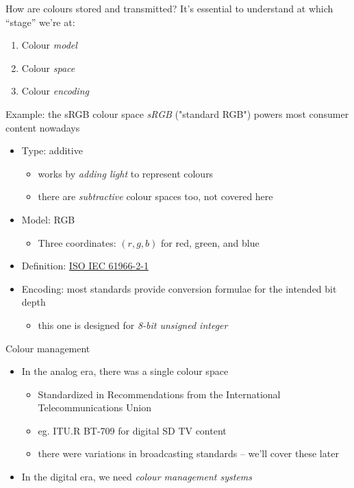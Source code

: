 \documentclass[aspectratio=169,handout]{fireshonks}
\begin{document}
\begin{frame}{How are colours stored and transmitted?}
    It's essential to understand at which \enquote{stage} we're at:
    \begin{enumerate}
        \item Colour \emph{model}
        \item Colour \emph{space}
        \item Colour \emph{encoding}
    \end{enumerate}
\end{frame}
\begin{frame}{Example: the sRGB colour space}
    \emph{sRGB} ("standard RGB") powers most consumer content nowadays
    \begin{itemize}
        \item Type: additive
              \begin{itemize}
                  \item works by \emph{adding light} to represent colours
                  \item there are \emph{subtractive} colour spaces too, not covered here
              \end{itemize}
        \item Model: RGB
              \begin{itemize}
                  \item Three coordinates: $(r, g, b)$ for red, green, and blue
              \end{itemize}
        \item Definition: \href{https://www.evs.ee/en/evs-en-61966-2-1-2002}{ISO IEC 61966-2-1}
        \item Encoding: most standards provide conversion formulae for the intended bit depth
              \begin{itemize}
                  \item this one is designed for \emph{8-bit unsigned integer}
              \end{itemize}
    \end{itemize}
\end{frame}
\begin{frame}{Colour management}
    \begin{itemize}
        \item In the analog era, there was a single colour space
              \begin{itemize}
                  \item Standardized in Recommendations from the International Telecommunications Union
                  \item eg. ITU.R BT-709 \parencite{BT709} for digital SD TV content
                  \item there were variations in broadcasting standards -- we'll cover these later
              \end{itemize}
        \item In the digital era, we need \emph{colour management systems}
    \end{itemize}
\end{frame}
\end{document}

